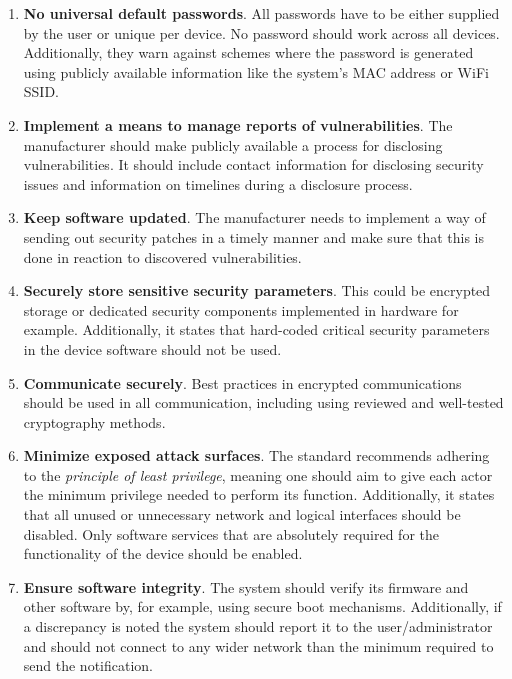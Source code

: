 \begin{enumerate}
    \item \textbf{No universal default passwords}. All passwords have to be either supplied by the user or unique per device. No password should work across all devices. Additionally, they warn against schemes where the password is generated using publicly available information like the system's MAC address or WiFi SSID.
    
    \item \textbf{Implement a means to manage reports of vulnerabilities}. The manufacturer should make publicly available a process for disclosing vulnerabilities. It should include contact information for disclosing security issues and information on timelines during a disclosure process.
    
    \item \textbf{Keep software updated}. The manufacturer needs to implement a way of sending out security patches in a timely manner and make sure that this is done in reaction to discovered vulnerabilities.
    
    \item \textbf{Securely store sensitive security parameters}. This could be encrypted storage or dedicated security components implemented in hardware for example. Additionally, it states that hard-coded critical security parameters in the device software should not be used.
    
    \item \textbf{Communicate securely}. Best practices in encrypted communications should be used in all communication, including using reviewed and well-tested cryptography methods.
    
    \item \textbf{Minimize exposed attack surfaces}. The standard recommends adhering to the \textit{principle of least privilege}, meaning one should aim to give each actor the minimum privilege needed to perform its function. Additionally, it states that all unused or unnecessary network and logical interfaces should be disabled. Only software services that are absolutely required for the functionality of the device should be enabled.
    
    \item \textbf{Ensure software integrity}. The system should verify its firmware and other software by, for example, using secure boot mechanisms. Additionally, if a discrepancy is noted the system should report it to the user/administrator and should not connect to any wider network than the minimum required to send the notification.
    

\end{enumerate}
